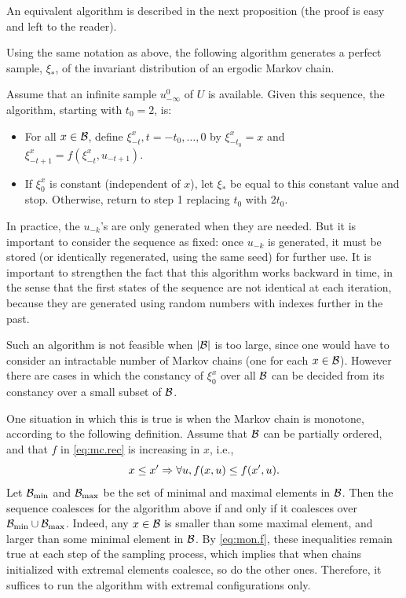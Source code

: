 An equivalent algorithm is described in the next proposition (the
proof is easy and left to the reader).
\begin{proposition}
\label{prop:perf.samp.alg}
Using the same notation as above, the following algorithm generates a
perfect sample, $\xi_*$, of the invariant
distribution of an ergodic Markov chain. 

Assume that an
infinite sample $u_{-\infty}^0$ of $U$ is available. Given
this sequence, the algorithm, starting with $t_0=2$, is:
\begin{itemize}
\item[1.] For all $x\in {\mathcal B}$, define $\xi^x_{-t}, t=-t_0, \ldots, 0$ by
$\xi^x_{-t_0} = x$ and $\xi_{-t+1}^x = f(\xi_{-t}^x, u_{-t+1})$.
\item[2.] If $\xi_0^x$ is constant (independent of $x$), let $\xi_*$
be equal to this constant value and stop. Otherwise, return to step 1
replacing $t_0$ with $2t_0$.
\end{itemize}
\end{proposition}
In practice, the $u_{-k}$'s are only generated when they are needed. But
it is important to consider the sequence as fixed: once $u_{-k}$ is generated,
it must be stored (or identically regenerated, using the same seed) for further use. It is
important to strengthen the fact that this algorithm works backward in
time, in the sense that the first states of the sequence are not
identical at each iteration, because they are generated
using random numbers with indexes further in the past.

Such an algorithm is not feasible when  $|{\mathcal B}|$ is too large, since
one would have to consider an intractable number of Markov chains (one
for each $x\in{\mathcal B}$). However there are cases in which the constancy of $\xi_0^x$ over all ${\mathcal B}$ can be
decided from its constancy over a small subset of ${\mathcal B}$. 

One situation in which this is true is when the Markov chain is
monotone, according to the following definition. Assume that ${\mathcal B}$ can be
partially ordered, and that $f$ in  \cref{eq:mc.rec} is
increasing in $x$, i.e.,
\begin{equation}
\label{eq:mon.f}
x \leq x' \Rightarrow \forall u, f(x,u) \leq f(x',u).
\end{equation}
Let ${\mathcal B}_{\mathrm{min}}$ and ${\mathcal B}_{\mathrm{max}}$ be the set of
minimal and maximal elements in ${\mathcal B}$. Then the sequence coalesces for
the algorithm above if and only if it coalesces over
${\mathcal B}_{\mathrm{min}} \cup {\mathcal B}_{\mathrm{max}}$. Indeed, any $x\in {\mathcal B}$ is
smaller than some maximal element, and larger than some minimal
element in ${\mathcal B}$. By \cref{eq:mon.f}, these inequalities remain true
at each step of the sampling process, which implies that when chains
initialized with extremal elements coalesce, so do the other
ones. Therefore,  it
suffices to run the algorithm with extremal configurations only.

